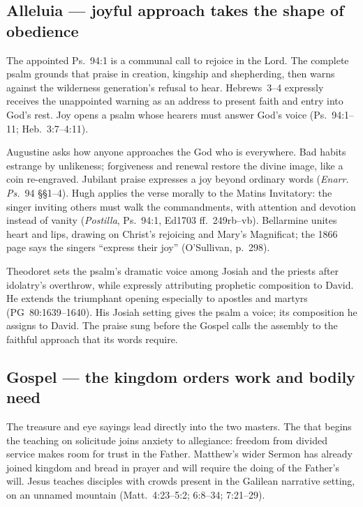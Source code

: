 \subsection*{Alleluia --- joyful approach takes the shape of obedience\enspace{}}\label{alleluia-treatment}

The appointed Ps.~94:1 is a communal call to rejoice in the Lord. The complete
psalm grounds that praise in creation, kingship and shepherding, then warns
against the wilderness generation's refusal to hear. Hebrews~3--4 expressly
receives the unappointed warning as an address to present faith and entry
into God's rest. Joy opens a psalm whose hearers must answer God's voice
(Ps.~94:1--11; Heb.~3:7--4:11).

Augustine asks how anyone approaches the God who is everywhere. Bad habits
estrange by unlikeness; forgiveness and renewal restore the divine image,
like a coin re-engraved. Jubilant praise expresses a joy beyond ordinary
words (\emph{Enarr. Ps.}~94 §§1--4). Hugh applies the verse morally to the
Matins Invitatory: the singer inviting others must walk the commandments,
with attention and devotion instead of vanity (\emph{Postilla}, Ps.~94:1,
Ed1703 ff.~249rb--vb). Bellarmine unites heart and lips, drawing on Christ's
rejoicing and Mary's Magnificat; the 1866 page says the singers
``express their joy'' (O'Sullivan, p.~298).

Theodoret sets the psalm's dramatic voice among Josiah and the priests after
idolatry's overthrow, while expressly attributing prophetic composition to
David. He extends the triumphant opening especially to apostles and martyrs
(PG~80:1639--1640). His Josiah setting gives the psalm a voice; its
composition he assigns to David. The praise sung before the Gospel calls the
assembly to the faithful approach that its words require.

\subsection*{Gospel --- the kingdom orders work and bodily need\enspace{}}\label{gospel-treatment}

The treasure and eye sayings lead directly into the two masters. The
 that begins the teaching on solicitude joins anxiety to
allegiance: freedom from divided service makes room for trust in the Father.
Matthew's wider Sermon has already joined kingdom and bread in prayer and
will require the doing of the Father's will. Jesus teaches disciples with
crowds present in the Galilean narrative setting, on an unnamed mountain
(Matt.~4:23--5:2; 6:8--34; 7:21--29).

